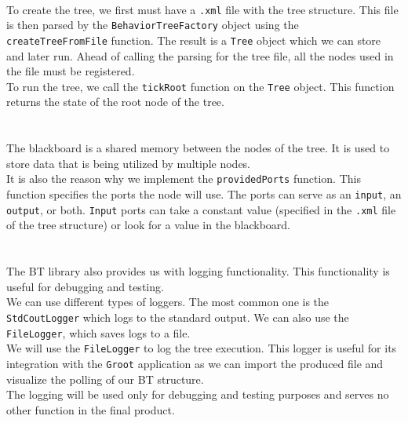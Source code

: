         \\
            To create the tree, we first must have a \texttt{.xml} file with the tree structure. This file is then parsed by the \texttt{BehaviorTreeFactory} object using the \texttt{createTreeFromFile} function. The result is a \texttt{Tree} object which we can store and later run. Ahead of calling the parsing for the tree file, all the nodes used in the file must be registered.\\
            To run the tree, we call the \texttt{tickRoot} function on the \texttt{Tree} object. This function returns the state of the root node of the tree.\\\\
        \\
            The blackboard is a shared memory between the nodes of the tree. It is used to store data that is being utilized by multiple nodes.\\
            It is also the reason why we implement the \texttt{providedPorts} function. This function specifies the ports the node will use. The ports can serve as an \texttt{input}, an \texttt{output}, or both. \texttt{Input} ports can take a constant value (specified in the \texttt{.xml} file of the tree structure) or look for a value in the blackboard.\\\\
        \\
            The BT library also provides us with logging functionality. This functionality is useful for debugging and testing.\\
            We can use different types of loggers. The most common one is the \texttt{StdCoutLogger} which logs to the standard output. We can also use the \texttt{FileLogger}, which saves logs to a file.\\
            We will use the \texttt{FileLogger} to log the tree execution. This logger is useful for its integration with the \texttt{Groot} application as we can import the produced file and visualize the polling of our BT structure.\\
            The logging will be used only for debugging and testing purposes and serves no other function in the final product.
